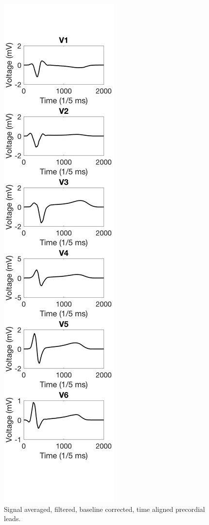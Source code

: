 \documentclass[12pt]{article}
\begin{document}
\begin{figure}[H]
	
	\centering
	\includegraphics[width = .95\textwidth]{Figures/Precordial_timeallign_sigaveraged.png}
	\caption{Signal averaged, filtered, baseline corrected, time aligned precordial leads.}
	\label{fig:PrecordSig}
\end{figure}
\end{document}
